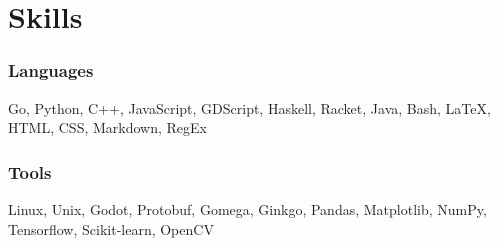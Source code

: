 \section{Skills}

\begin{resumeItem}
\subsubsection{Languages}
Go, Python, C++, JavaScript, GDScript, Haskell, Racket, Java, Bash, {\LaTeX}, HTML, CSS, Markdown, RegEx

\subsubsection{Tools}
Linux, Unix, Godot, Protobuf, Gomega, Ginkgo, Pandas, Matplotlib, NumPy, Tensorflow, Scikit-learn, OpenCV
\end{resumeItem}

